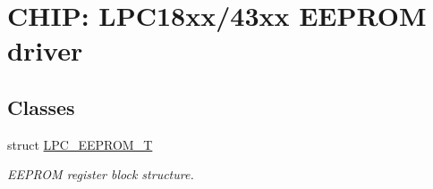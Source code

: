\hypertarget{group___e_e_p_r_o_m__18_x_x__43_x_x}{}\section{C\+H\+IP\+: L\+P\+C18xx/43xx E\+E\+P\+R\+OM driver}
\label{group___e_e_p_r_o_m__18_x_x__43_x_x}
\subsection*{Classes}
\begin{DoxyCompactItemize}
\item 
struct \hyperlink{struct_l_p_c___e_e_p_r_o_m___t}{L\+P\+C\+\_\+\+E\+E\+P\+R\+O\+M\+\_\+T}
\begin{DoxyCompactList}\small\item\em E\+E\+P\+R\+OM register block structure. \end{DoxyCompactList}\end{DoxyCompactItemize}
